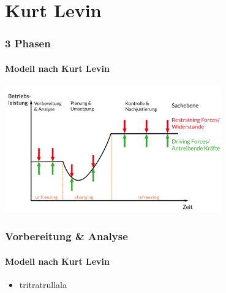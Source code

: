 \documentclass[aspectratio=169]{beamer}
\begin{document}
\section{Kurt Levin}
\begin{frame}
\frametitle{3 Phasen}\framesubtitle{Modell nach Kurt Levin}
\centering
\includegraphics[width=0.7\textwidth]{3Phasen_Kurt_Lewin_web.jpg}
\end{frame}

\begin{frame}
\frametitle{Vorbereitung \& Analyse}\framesubtitle{Modell nach Kurt Levin}
\begin{itemize}
\item tritratrullala

\end{itemize}
\end{frame}
\end{document}
